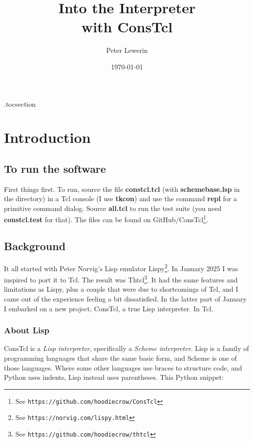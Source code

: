 \documentclass[twoside,9pt]{report}
\title{Into the Interpreter\\with ConsTcl}
\author{Peter Lewerin}
\date{\today}
\begin{document}
\pagestyle{headings}
\maketitle

\renewcommand*{\contentsname}{Short contents}
\etocsettocdepth.toc{section}
\tableofcontents

\renewcommand*\contentsname{Detailed contents}
\etocignoretoctocdepth
\tableofcontents


\chapter{Introduction}
\label{introduction}
\section{To run the software}
\label{to-run-the-software}


First things first. To run, source the file \textbf{constcl.tcl} (with
\textbf{schemebase.lsp} in the directory) in a Tcl console (I use
\textbf{tkcon}) and use the command \textbf{repl} for a primitive command
dialog. Source \textbf{all.tcl} to run the test suite (you need
\textbf{constcl.test} for that). The files can be found on GitHub/ConsTcl\footnote{See
\texttt{https://github.com/hoodiecrow/ConsTcl}}.

\section{Background}
\label{background}

It all started with Peter Norvig's Lisp emulator
Lispy\footnote{See \texttt{https://norvig.com/lispy.html}}. In January 2025 I
was inspired to port it to Tcl. The result was Thtcl\footnote{See
\texttt{https://github.com/hoodiecrow/thtcl}}. It had the same features and
limitations as Lispy, plus a couple that were due to shortcomings of Tcl, and I
came out of the experience feeling a bit dissatisfied. In the latter part of
January I embarked on a new project, ConsTcl, a true Lisp interpreter. In Tcl.

\subsection{About Lisp}
\label{about-lisp}

ConsTcl is a \emph{Lisp interpreter}, specifically a \emph{Scheme interpreter}.
Lisp is a family of programming languages that share the same basic form, and
Scheme is one of those languages. Where some other languages use braces to
structure code, and Python uses indents, Lisp instead uses parentheses. This
Python snippet:
\end{document}
